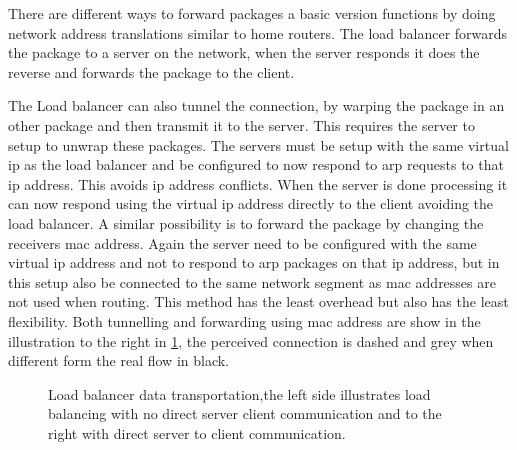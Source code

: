 There are different ways to forward packages a basic version functions by doing network address translations similar to home routers.
The load balancer forwards the package to a server on the network, when the server responds it does the reverse and forwards the package to the client.

The Load balancer can also tunnel the connection, by warping the package in an other package and then transmit it to the server. This requires the server to setup to unwrap these packages. The servers must be setup with the same virtual ip as the load balancer and be configured to now respond to arp requests to that ip address. This avoids ip address conflicts. When the server is done processing it can now respond using the virtual ip address directly to the client avoiding the load balancer.
A similar possibility is to forward the package by changing the receivers mac address. Again the server need to be configured with the same virtual ip address and not to respond to arp packages on that ip address, but in this setup also be connected to the same network segment as mac addresses are not used when routing. This method has the least overhead but also has the least flexibility. Both tunnelling and forwarding using mac address are show in the illustration to the right in \cref{fig:LoadbalancerOperation}, the perceived connection is dashed and grey when different form the real flow in black.


\begin{figure}
	\centering
	\scalebox{0.7}{}
	\scalebox{0.7}{}
	\caption[Load balancer data transportation]{
		\label{fig:LoadbalancerOperation} 
		\footnotesize{%
			Load balancer data transportation,the left side illustrates load balancing with no direct server client communication and to the right with direct server to client communication.
		}
	}
\end{figure}


